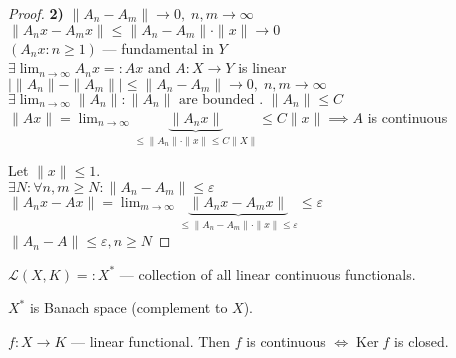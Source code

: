  \begin{proof}
   \textbf{2)  }
   $\|A_n - A_m\| \to  0, \; n,m \to  \infty$\\
   $\|A_n x - A_m x\| \le  \|A_n - A_m\| \cdot \|x\| \to 0$\\
   $\left( A_n x : n \ge 1 \right) $ --- fundamental in $Y$ \\
   $\exists  \lim_{n \to \infty} A_n x =: Ax$ and $A: X \to Y$ is linear\\
   $\left| \|A_n\| - \|A_m\| \right| \le \|A_n - A_m\| \to 0, \; n,m \to \infty$\\
   $\exists \lim_{n \to \infty} \|A_n\|: \|A_n\| \text{ are bounded . } \|A_n\| \le C$ \\
   $\|Ax\| = \lim_{n \to \infty} \underbrace{\|A_n x\|}_{\le  \|A_n\| \cdot \|x\| \le  C \|X\|} \le C\|x\| \implies A$ is continuous

   Let $\|x\| \le 1$.\\
   $\exists N : \forall n,m \ge  N : \|A_n - A_m\| \le  \varepsilon$\\
   $\|A_n x - A x\| = \lim_{m \to \infty} \underbrace{\|A_n x - A_m x\|}_{\le  \|A_n - A_m\| \cdot \|x\| \le  \varepsilon} \le \varepsilon$ \\
   $\|A_n - A\| \le  \varepsilon, n \ge  N$
 \end{proof}

 \hr

 $\mathcal{L}(X, K) =: X^{*}$ --- collection of all linear continuous functionals.

 $X^{*}$ is Banach space (complement to $X$).


 \begin{theorem}
   $f: X \to K$ --- linear functional.
   Then $f$ is continuous $\iff \operatorname{Ker}f$ is closed.
 \end{theorem}

